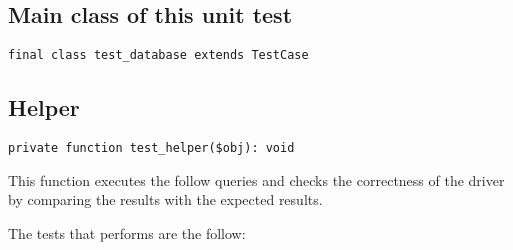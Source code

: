 \documentclass[a4paper]{book}
\begin{document}
\hypertarget{toc45}{}
\subsection{Main class of this unit test}

\begin{lstlisting}
final class test_database extends TestCase
\end{lstlisting}

\hypertarget{toc46}{}
\subsection{Helper}

\begin{lstlisting}
private function test_helper($obj): void
\end{lstlisting}

This function executes the follow queries and checks the correctness
of the driver by comparing the results with the expected results.

The tests that performs are the follow:
\end{document}
